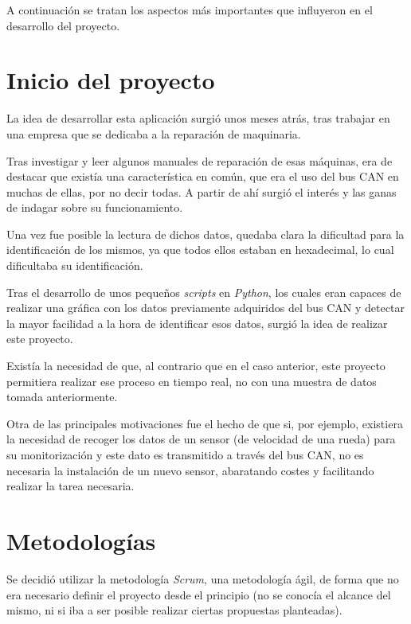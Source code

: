 
A continuación se tratan los aspectos más importantes que influyeron en el desarrollo del proyecto.

\section{Inicio del proyecto}\label{inicio_del_proyecto}

La idea de desarrollar esta aplicación surgió unos meses atrás, tras trabajar en una empresa que se dedicaba a la reparación de maquinaria.

Tras investigar y leer algunos manuales de reparación de esas máquinas, era de destacar que existía una característica en común, que era el uso del bus CAN en muchas de ellas, por no decir todas. A partir de ahí surgió el interés y las ganas de indagar sobre su funcionamiento.

Una vez fue posible la lectura de dichos datos, quedaba clara la dificultad para la identificación de los mismos, ya que todos ellos estaban en hexadecimal, lo cual dificultaba su identificación.

Tras el desarrollo de unos pequeños \emph{scripts} en \emph{Python}, los cuales eran capaces de realizar una gráfica con los datos previamente adquiridos del bus CAN y detectar la mayor facilidad a la hora de identificar esos datos, surgió la idea de realizar este proyecto.

Existía la necesidad de que, al contrario que en el caso anterior, este proyecto permitiera realizar ese proceso en tiempo real, no con una muestra de datos tomada anteriormente.

Otra de las principales motivaciones fue el hecho de que si, por ejemplo, existiera la necesidad de recoger los datos de un sensor (de velocidad de una rueda) para su monitorización y este dato es transmitido a través del bus CAN, no es necesaria la instalación de un nuevo sensor, abaratando costes y facilitando realizar la tarea necesaria.

\section{Metodologías}\label{metodologias}

Se decidió utilizar la metodología \emph{Scrum}, una metodología ágil, de forma que no era necesario definir el proyecto desde el principio (no se conocía el alcance del mismo, ni si iba a ser posible realizar ciertas propuestas planteadas).


